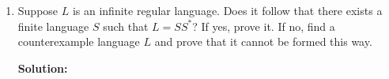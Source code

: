 \documentclass[boldsans]{article}
\newenvironment{solution}
{\bigskip \noindent \textbf{Solution: \\}}
{}
\renewcommand{\L}{\mathcal{L}}
\begin{document}
\begin{enumerate}
\begin{enumerate}
    \begin{solution}

    \end{solution}
    
    \item If $M$ is frumious, what can we say about the language accepted by $M$, $\L(M)$?
    
    \begin{solution}

    \end{solution}
    
    \item How many distinct languages over the alphabet $\{0, 1\}$ can be recognized by frumious DFSAs? Briefly explain your answer.
    
    \begin{solution}

    \end{solution}
\end{enumerate}

\newpage
\item Suppose $L$ is an infinite regular language. Does it follow that there exists a finite language $S$ such that $L = SS^*$? If yes, prove it. If no, find a counterexample language $L$ and prove that it cannot be formed this way.

\begin{solution}

\end{solution}

\end{enumerate}
\end{document}
